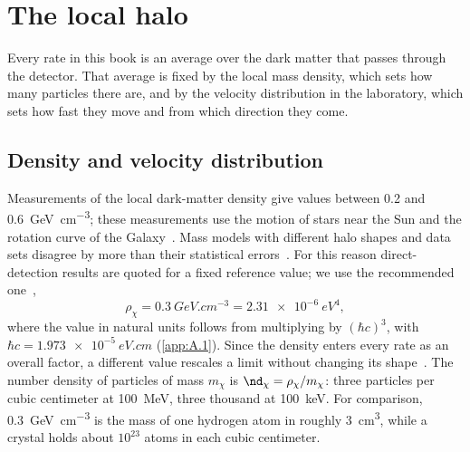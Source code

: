 \section{The local halo}\label{sec:1.2}

Every rate in this book is an average over the dark matter that passes through the detector. That average is fixed by the local mass density, which sets how many particles there are, and by the velocity distribution in the laboratory, which sets how fast they move and from which direction they come.

\subsection{Density and velocity distribution}

Measurements of the local dark-matter density give values between 0.2 and \SI{0.6}{GeV.cm^{-3}}; these measurements use the motion of stars near the Sun and the rotation curve of the Galaxy~\cite[Sect.~3.1.1]{baxter2021recommended}. Mass models with different halo shapes and data sets disagree by more than their statistical errors~\cite[Sect.~3.1]{green2012astrophysical}. For this reason direct-detection results are quoted for a fixed reference value; we use the recommended one~\cite[Table~1]{baxter2021recommended},
\begin{equation}
  \rho_\chi = \SI{0.3}{GeV.cm^{-3}} = \SI{2.31e-6}{eV^4},
  \label{eq:1.2-rho}
\end{equation}
where the value in natural units follows from multiplying by $(\hbar c)^3$, with $\hbar c = \SI{1.973e-5}{eV.cm}$ (\cref{app:A.1}). Since the density enters every rate as an overall factor, a different value rescales a limit without changing its shape~\cite[Sect.~3.1.1]{baxter2021recommended}. The number density of particles of mass $m_\chi$ is $\nd_\chi = \rho_\chi/m_\chi$: three particles per cubic centimeter at \SI{100}{MeV}, three thousand at \SI{100}{keV}. For comparison, \SI{0.3}{GeV.cm^{-3}} is the mass of one hydrogen atom in roughly \SI{3}{cm^3}, while a crystal holds about $10^{23}$ atoms in each cubic centimeter.

